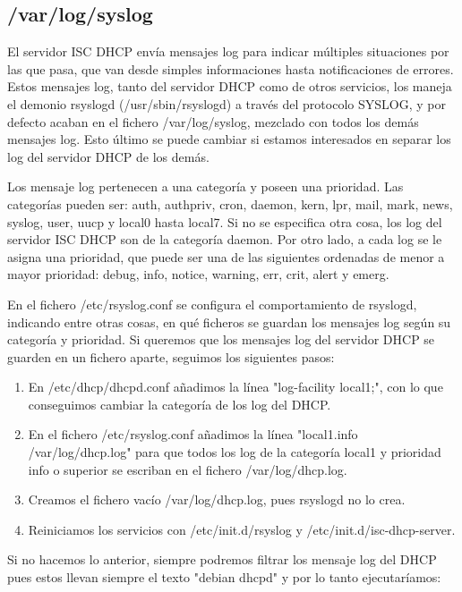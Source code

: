  	\subsection{/var/log/syslog}
 	
 	El servidor ISC DHCP envía mensajes log para indicar múltiples situaciones por las que pasa, que van desde simples informaciones hasta notificaciones de errores. Estos mensajes log, tanto del servidor DHCP como de otros servicios, los maneja el demonio rsyslogd (/usr/sbin/rsyslogd) a través del protocolo SYSLOG, y por defecto acaban en el fichero /var/log/syslog, mezclado con todos los demás mensajes log. Esto último se puede cambiar si estamos interesados en separar los log del servidor DHCP de los demás.
 	
 	Los mensaje log pertenecen a una categoría y poseen una prioridad. Las categorías pueden ser: auth, authpriv, cron, daemon, kern, lpr, mail, mark, news, syslog, user, uucp y local0 hasta local7. Si no se especifica otra cosa, los log del servidor ISC DHCP son de la categoría daemon. Por otro lado, a cada log se le asigna una prioridad, que puede ser una de las siguientes ordenadas de menor a mayor prioridad: debug, info, notice, warning, err, crit, alert y emerg.
 	
 	En el fichero /etc/rsyslog.conf se configura el comportamiento de rsyslogd, indicando entre otras cosas, en qué ficheros se guardan los mensajes log según su categoría y prioridad. Si queremos que los mensajes log del servidor DHCP se guarden en un fichero aparte, seguimos los siguientes pasos:
 	\begin{enumerate}
 		\item En /etc/dhcp/dhcpd.conf añadimos la línea "log-facility local1;", con lo que conseguimos cambiar la categoría de los log del DHCP.
 		\item En el fichero /etc/rsyslog.conf añadimos la línea "local1.info /var/log/dhcp.log" para que todos los log de la categoría local1 y prioridad info o superior se escriban en el fichero /var/log/dhcp.log.
 		\item Creamos el fichero vacío /var/log/dhcp.log, pues rsyslogd no lo crea.
 		\item Reiniciamos los servicios con /etc/init.d/rsyslog y /etc/init.d/isc-dhcp-server.
 	\end{enumerate}
 	Si no hacemos lo anterior, siempre podremos filtrar los mensaje log del DHCP pues estos llevan siempre el texto "debian dhcpd" y por lo tanto ejecutaríamos:
 	
